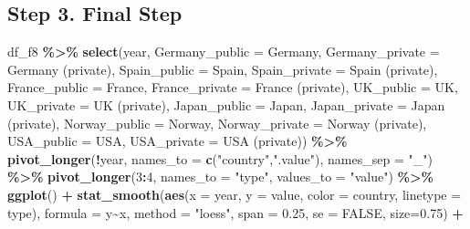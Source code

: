 \documentclass[
  xelatex, ja=standard]{bxjsbook}
\newenvironment{Shaded}{\begin{snugshade}}{\end{snugshade}}
\newcommand{\AttributeTok}[1]{\textcolor[rgb]{0.13,0.29,0.53}{#1}}
\newcommand{\ConstantTok}[1]{\textcolor[rgb]{0.56,0.35,0.01}{#1}}
\newcommand{\DecValTok}[1]{\textcolor[rgb]{0.00,0.00,0.81}{#1}}
\newcommand{\FloatTok}[1]{\textcolor[rgb]{0.00,0.00,0.81}{#1}}
\newcommand{\FunctionTok}[1]{\textcolor[rgb]{0.13,0.29,0.53}{\textbf{#1}}}
\newcommand{\NormalTok}[1]{#1}
\newcommand{\SpecialCharTok}[1]{\textcolor[rgb]{0.81,0.36,0.00}{\textbf{#1}}}
\newcommand{\StringTok}[1]{\textcolor[rgb]{0.31,0.60,0.02}{#1}}
\theoremstyle{definition}
\theoremstyle{definition}
\theoremstyle{definition}
\theoremstyle{definition}
\theoremstyle{remark}
\begin{document}
\hypertarget{step-3.-final-step}{%
\subsection{Step 3. Final Step}\label{step-3.-final-step}}

\begin{Shaded}
\begin{Highlighting}[]
\NormalTok{df\_f8 }\SpecialCharTok{\%\textgreater{}\%} 
  \FunctionTok{select}\NormalTok{(year, }\AttributeTok{Germany\_public =}\NormalTok{ Germany, }\AttributeTok{Germany\_private =} \StringTok{\textquotesingle{}Germany (private)\textquotesingle{}}\NormalTok{, }
         \AttributeTok{Spain\_public =}\NormalTok{ Spain, }\AttributeTok{Spain\_private =} \StringTok{\textquotesingle{}Spain (private)\textquotesingle{}}\NormalTok{, }
         \AttributeTok{France\_public =}\NormalTok{ France, }\AttributeTok{France\_private =} \StringTok{\textquotesingle{}France (private)\textquotesingle{}}\NormalTok{, }
         \AttributeTok{UK\_public  =}\NormalTok{ UK, }\AttributeTok{UK\_private =} \StringTok{\textquotesingle{}UK (private)\textquotesingle{}}\NormalTok{, }
         \AttributeTok{Japan\_public =}\NormalTok{ Japan, }\AttributeTok{Japan\_private =} \StringTok{\textquotesingle{}Japan (private)\textquotesingle{}}\NormalTok{, }
         \AttributeTok{Norway\_public =}\NormalTok{ Norway, }\AttributeTok{Norway\_private =} \StringTok{\textquotesingle{}Norway (private)\textquotesingle{}}\NormalTok{,}
         \AttributeTok{USA\_public =}\NormalTok{ USA, }\AttributeTok{USA\_private =} \StringTok{\textquotesingle{}USA (private)\textquotesingle{}}\NormalTok{) }\SpecialCharTok{\%\textgreater{}\%}
  \FunctionTok{pivot\_longer}\NormalTok{(}\SpecialCharTok{!}\NormalTok{year, }\AttributeTok{names\_to =} \FunctionTok{c}\NormalTok{(}\StringTok{"country"}\NormalTok{,}\StringTok{".value"}\NormalTok{), }\AttributeTok{names\_sep =} \StringTok{"\_"}\NormalTok{) }\SpecialCharTok{\%\textgreater{}\%}
  \FunctionTok{pivot\_longer}\NormalTok{(}\DecValTok{3}\SpecialCharTok{:}\DecValTok{4}\NormalTok{, }\AttributeTok{names\_to =} \StringTok{"type"}\NormalTok{, }\AttributeTok{values\_to =} \StringTok{"value"}\NormalTok{) }\SpecialCharTok{\%\textgreater{}\%}
  \FunctionTok{ggplot}\NormalTok{() }\SpecialCharTok{+}
  \FunctionTok{stat\_smooth}\NormalTok{(}\FunctionTok{aes}\NormalTok{(}\AttributeTok{x =}\NormalTok{ year, }\AttributeTok{y =}\NormalTok{ value, }\AttributeTok{color =}\NormalTok{ country, }\AttributeTok{linetype =}\NormalTok{ type), }
              \AttributeTok{formula =}\NormalTok{ y}\SpecialCharTok{\textasciitilde{}}\NormalTok{x, }\AttributeTok{method =} \StringTok{"loess"}\NormalTok{, }\AttributeTok{span =} \FloatTok{0.25}\NormalTok{, }\AttributeTok{se =} \ConstantTok{FALSE}\NormalTok{, }\AttributeTok{size=}\FloatTok{0.75}\NormalTok{) }\SpecialCharTok{+}

\end{Highlighting}
\end{Shaded}
\end{document}
